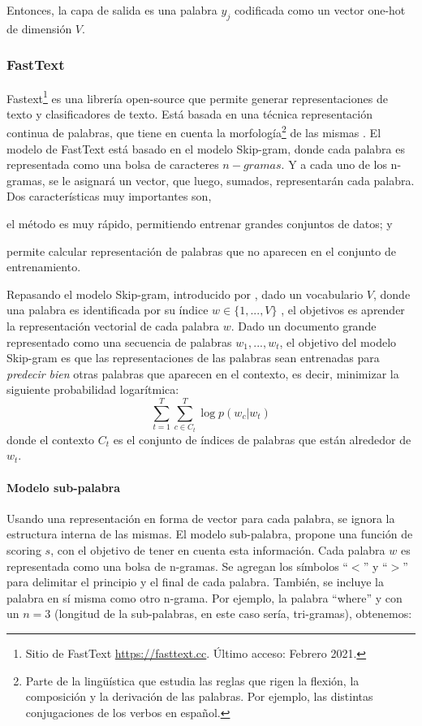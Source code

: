\bigskip Entonces, la capa de salida es una palabra \(y_j\) codificada como un vector one-hot de dimensión \(V\).

\subsubsection{FastText}
Fastext\footnote{Sitio de FastText \url{https://fasttext.cc}. Último acceso: Febrero 2021.} es una librería open-source que permite generar representaciones de texto y clasificadores de texto. Está basada en una técnica representación continua de palabras, que tiene en cuenta la morfología\footnote{Parte de la lingüística que estudia las reglas que rigen la flexión, la composición y la derivación de las palabras. Por ejemplo, las distintas conjugaciones de los verbos en español.} de las mismas \citep{bojanowski2017enriching}.
El modelo de FastText está basado en el modelo Skip-gram, donde cada palabra es representada como una bolsa de caracteres \(n-gramas\). Y a cada uno de los n-gramas, se le asignará un vector, que luego, sumados, representarán cada palabra. Dos características muy importantes son, \begin{enumerate*} [label=(\roman*)] \item el método es muy rápido, permitiendo entrenar grandes conjuntos de datos; y \item permite calcular representación de palabras que no aparecen en el conjunto de entrenamiento. \end{enumerate*}

\bigskip Repasando el modelo Skip-gram, introducido por \cite{mikolov2013efficient}, dado un vocabulario \(V\), donde una palabra es identificada por su índice \(w \in \{1,... , V\}\) , el objetivos es aprender la representación vectorial de cada palabra \(w\). Dado un documento grande representado como una secuencia de palabras \(w_1, ..., w_t\), el objetivo del modelo Skip-gram es que las representaciones de las palabras sean entrenadas para \textit{predecir bien} otras palabras que aparecen en el contexto, es decir, minimizar la siguiente probabilidad logarítmica:
\[\sum_{t=1}^{T}\sum_{c \in C_t}^{T}{\log p(w_c | w_t)}\]
donde el contexto \(C_t\) es el conjunto de índices de palabras que están alrededor de \(w_t\).

\paragraph{Modelo sub-palabra}
Usando una representación en forma de vector para cada palabra, se ignora la estructura interna de las mismas. El modelo sub-palabra, propone una función de scoring \(s\), con el objetivo de tener en cuenta esta información.
Cada palabra \(w\) es representada como una bolsa de n-gramas. Se agregan los símbolos ``\(<\)'' y ``\(>\)'' para delimitar el principio y el final de cada palabra. También, se incluye la palabra en sí misma como otro n-grama. Por ejemplo, la palabra ``where'' y con un \(n = 3\) (longitud de la sub-palabras, en este caso sería, tri-gramas), obtenemos:

